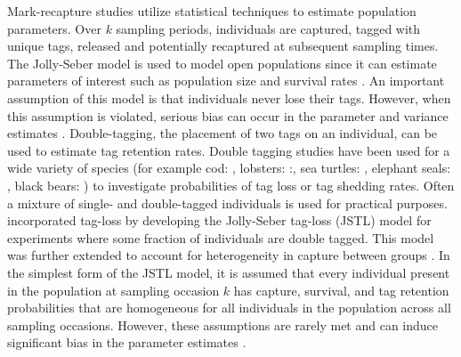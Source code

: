 \documentclass[12pt]{article}
\begin{document}
Mark-recapture studies utilize statistical techniques to estimate
population parameters. Over \(k\) sampling
periods, individuals are captured, tagged with unique tags, released and potentially
recaptured at subsequent sampling times. The Jolly-Seber model \citep{Jolly:1965, Seber:1965}
 is used to model open populations since it
can estimate parameters of interest such as population size and survival
rates \citep{Pollock:1990}. An important assumption of this model is that 
individuals never lose their tags. However, when this assumption is
violated, serious bias can occur in the parameter and variance estimates
\citep{Arnason:1981}. Double-tagging, the placement of two tags on
an individual, can be used to estimate tag retention rates. Double tagging studies have been used for a wide variety of species (for example cod: \citealt{Bjornsson:2011}, lobsters: \citealt{Xu:2014}:, sea turtles: \citealt{Bjorndal:1996}, elephant seals: \citealt{Pistorius:2000}, black bears: \citealt{Diefenbach:1998})   to investigate probabilities of tag loss or tag shedding rates.  Often a
mixture of single- and double-tagged individuals is used for practical
purposes. \cite{Cowen:2006} incorporated tag-loss by developing
the Jolly-Seber tag-loss (JSTL) model for experiments where some
fraction of individuals are double tagged. This model was further
extended to account for heterogeneity in capture between groups \citep{Xu:2014}. In the simplest form of the JSTL model, it is assumed that
every individual present in the population at sampling occasion \(k\)
has capture, survival, and tag retention
probabilities that are homogeneous for all individuals in the population
across all sampling occasions.  However, these assumptions are rarely met and can induce significant bias in the parameter estimates \citep{Schwarz:2012}.
\end{document}
